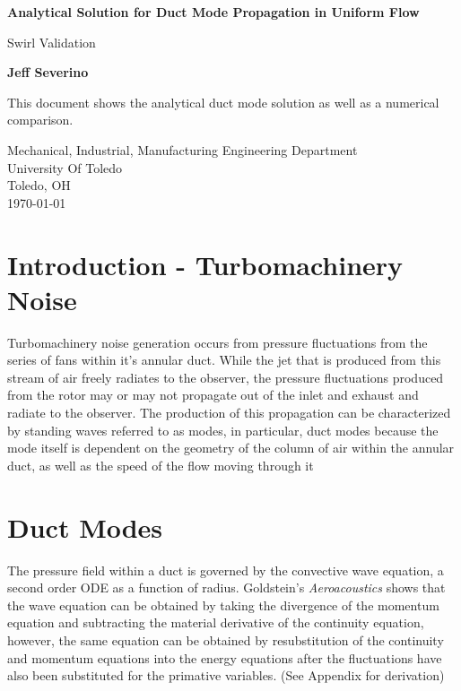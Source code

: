 \documentclass[a4paper]{report}
\begin{document}
\begin{titlepage}
    \begin{center}
        \vspace*{1cm}

        \textbf{Analytical Solution for Duct Mode Propagation in%
        Uniform Flow} 

        \vspace{0.5cm}
        Swirl Validation

        \vspace{1.5cm}

        \textbf{Jeff Severino}

        \vfill


        This document shows the analytical duct mode solution as well as a
        numerical comparison.
        \vspace{0.8cm}


        Mechanical, Industrial, Manufacturing Engineering Department\\
        University Of Toledo\\
        Toledo, OH\\
        \today

    \end{center}
\end{titlepage}

\section{Introduction - Turbomachinery Noise}
Turbomachinery noise generation occurs from pressure fluctuations from the series 
of fans within it's annular duct. While the jet that is produced from this stream
of air freely radiates to the observer, the pressure fluctuations 
produced from the rotor may or may not propagate out of the inlet and exhaust and 
radiate to the observer. The production of this propagation can be characterized
by standing waves referred to as modes, in particular, duct modes because 
the mode itself is dependent on the geometry of the column of air within the 
annular duct, as well as the speed of the flow moving through it
\newpage

\section{Duct Modes}
The pressure field within a duct is governed by the convective wave equation, a
second order ODE as a function of radius. Goldstein's \textit{Aeroacoustics} 
shows that the wave equation can be obtained by taking the divergence of the
momentum equation and subtracting the material derivative of the continuity 
equation, however, the same equation can be obtained by resubstitution of the 
continuity and momentum equations into the energy equations after the fluctuations 
have also been substituted for the primative variables. (See Appendix for derivation)
\end{document}
